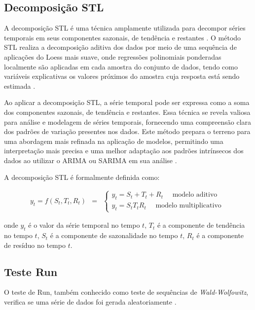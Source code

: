 \subsection{Decomposi\c c\~ao STL}
 
A decomposição STL é uma técnica amplamente utilizada para decompor séries temporais em seus componentes sazonais, de tendência e restantes \cite{RIBEIRO2023112982}. O método STL realiza a decomposição aditiva dos dados por meio de uma sequência de aplicações do Loess mais suave, onde regressões polinomiais ponderadas localmente são aplicadas em cada amostra do conjunto de dados, tendo como variáveis explicativas os valores próximos do amostra cuja resposta está sendo estimada \cite{Theodosiou20111178}.
 
Ao aplicar a decomposição STL, a série temporal pode ser expressa como a soma dos componentes sazonais, de tendência e restantes. Essa técnica se revela valiosa para análise e modelagem de séries temporais, fornecendo uma compreensão clara dos padrões de variação presentes nos dados. Este método prepara o terreno para uma abordagem mais refinada na aplicação de modelos, permitindo uma interpretação mais precisa e uma melhor adaptação aos padrões intrínsecos dos dados ao utilizar o ARIMA ou SARIMA em sua análise \cite{RIBEIRO2023112982}.
 
A decomposição STL é formalmente definida como:
 
 \begin{eqnarray}
 	y_t=f\left(S_t, T_t, R_t\right)&=&\left\{\begin{array}{l}
 		y_t=S_t+T_t+R_t \quad \text { modelo aditivo } \\
 		y_t=S_t T_t R_t \quad \text { modelo multiplicativo }
 	\end{array}\right. \label{eq:stl}
 \end{eqnarray}

\noindent onde $y_t$ é o valor da série temporal no tempo $t$, $T_t$ é a componente de tendência no tempo $t$, $S_t$ é a componente de sazonalidade no tempo $t$, $R_t$ é a componente de resíduo no tempo $t$.

\subsection{Teste Run}

O teste de Run, também conhecido como teste de sequências de \textit{Wald-Wolfowitz}, verifica se uma série de dados foi gerada aleatoriamente \cite{PAIVA}.

